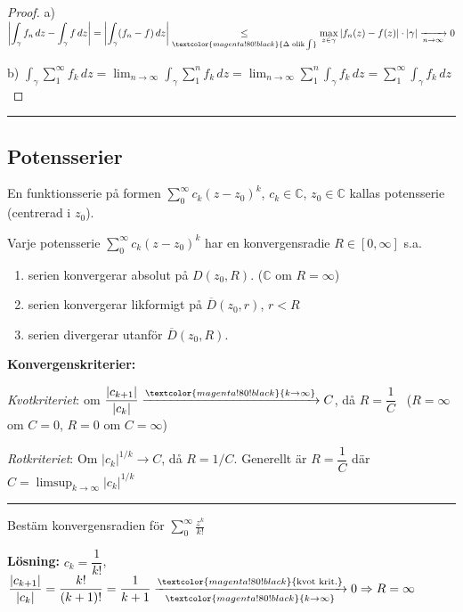 \begin{proof}
a) \quad $\displaystyle\left| \int_\gamma f_n\,dz - \int_\gamma f\,dz \right| = \left| \int_\gamma (f_n - f)\,dz \right| \underset{\textcolor{magenta!80!black}{\Delta \text{ olik} \int}}{\le} \max_{z \in \gamma} |f_n(z) - f(z)| \cdot |\gamma| \xrightarrow[n \to \infty]{} 0$

b) \quad $\displaystyle\int_\gamma \sum_1^\infty f_k\,dz = \lim_{n \to \infty} \int_\gamma \sum_1^n f_k\,dz = \lim_{n \to \infty} \sum_1^n \int_\gamma f_k\,dz = \sum_1^\infty \int_\gamma f_k\,dz$
\end{proof}

\noindent\rule{\linewidth}{0.4pt}

\subsection{Potensserier}
En funktionsserie på formen $\sum_0^\infty c_k(z - z_0)^k$, $c_k \in \mathbb{C}$, $z_0 \in \mathbb{C}$ kallas potensserie (centrerad i $z_0$).

\begin{theorem}[Sats 7.31]
Varje potensserie $\sum_0^\infty c_k(z - z_0)^k$ har en konvergensradie $R \in [0, \infty]$ s.a.
\begin{enumerate}[label=\textcolor{red!70!black}{\roman*)}]
  \item serien konvergerar absolut på $D(z_0, R)$. ($\mathbb{C}$ om $R = \infty$)
  \item serien konvergerar likformigt på $\overline{D}(z_0, r)$, $r < R$
  \item serien divergerar utanför $\overline{D}(z_0, R)$.
\end{enumerate}
\end{theorem}

\textbf{Konvergenskriterier:}

\emph{Kvotkriteriet}: om $\dfrac{|c_{k+1}|}{|c_k|} \xrightarrow{\textcolor{magenta!80!black}{k \to \infty}} C$, då $R = \dfrac{1}{C}$ \ ($R = \infty$ om $C = 0$, $R = 0$ om $C = \infty$)

\emph{Rotkriteriet}: Om $|c_k|^{1/k} \to C$, då $R = 1/C$. Generellt är $R = \dfrac{1}{C}$ där $C = \displaystyle\limsup_{k \to \infty} |c_k|^{1/k}$

\noindent\rule{\linewidth}{0.4pt}

\begin{example}
Bestäm konvergensradien för $\displaystyle\sum_0^\infty \frac{z^k}{k!}$

\textbf{Lösning:} $c_k = \dfrac{1}{k!}$, \ $\dfrac{|c_{k+1}|}{|c_k|} = \dfrac{k!}{(k + 1)!} = \dfrac{1}{k + 1} \xrightarrow[\textcolor{magenta!80!black}{k \to \infty}]{\textcolor{magenta!80!black}{\text{kvot krit.}}} 0 \Rightarrow R = \infty$
\end{example}

